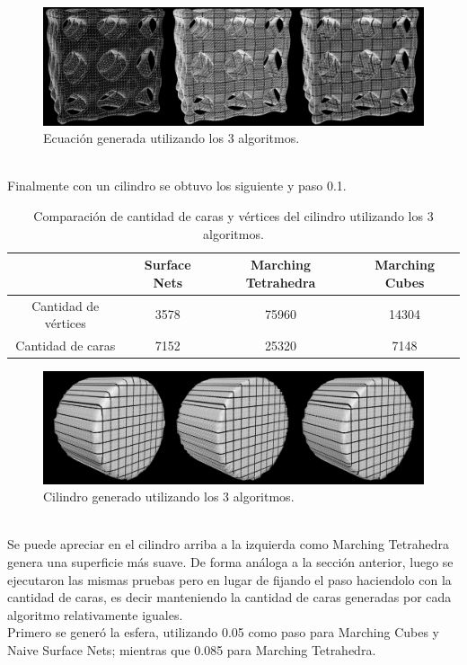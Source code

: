 \documentclass[12pt]{article}
\begin{document}
\begin{figure}[h!]
\includegraphics[width=\linewidth,center]{compec2.png}
\caption{Ecuación generada utilizando los 3 algoritmos.}
\end{figure}
\\Finalmente con un cilindro se obtuvo los siguiente y paso 0.1.
\begin{table}[h!]
  \centering
  \label{tab:table1}
  \begin{tabular}{cccc}
    \toprule
    & Surface Nets & Marching Tetrahedra & Marching Cubes\\
    \midrule
    Cantidad de vértices & 3578 & 75960 & 14304\\
    Cantidad de caras & 7152 & 25320 & 7148\\
    \bottomrule
  \end{tabular}
  \caption{Comparación de cantidad de caras y vértices del cilindro utilizando los 3 algoritmos.}
\end{table}
\begin{figure}[h!]
\includegraphics[width=\linewidth,center]{compec3.png}
\caption{Cilindro generado utilizando los 3 algoritmos.}
\end{figure}
\\Se puede apreciar en el cilindro arriba a la izquierda como Marching Tetrahedra genera una superficie más suave.
\clearpage
De forma análoga a la sección anterior, luego se ejecutaron las mismas pruebas pero en lugar de fijando el paso haciendolo con la cantidad de caras, es decir manteniendo la cantidad de caras generadas por cada algoritmo relativamente iguales.
\\Primero se generó la esfera, utilizando 0.05 como paso para Marching Cubes y Naive Surface Nets; mientras que 0.085 para Marching Tetrahedra.
\end{document}
